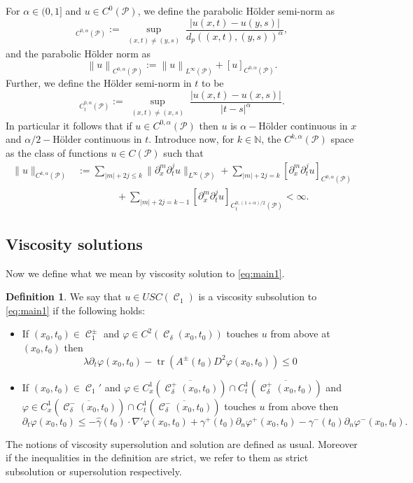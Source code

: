 \documentclass[12pt]{article}
\newcommand{\norm}[1]{\left\lVert#1\right\rVert}
\newcommand{\nor}[1]{\left\lvert#1\right\rvert}
\numberwithin{Theorem}{section}
\theoremstyle{definition}
\newtheorem{Definition}[Theorem]{Definition}
\theoremstyle{remark}
\numberwithin{equation}{section}
\DeclareMathOperator{\C}{\mathcal{C}}
\DeclareMathOperator*{\tr}{tr}
\newcommand{\p}{\partial}
\begin{document}
For ${ \alpha} \in (0,1]$ and $u\in C^{0}(\mathcal{P})$, we define the parabolic H\"older semi-norm as
\begin{equation*}
    [u]_{C^{0,\alpha}(\mathcal{P})} := \sup_{\substack{(x,t)\neq (y,s)}} \frac{\nor{u(x,t)-u(y,s)}}{d_p((x,t),(y,s))^{{ \alpha}}},
\end{equation*}
and the parabolic H\"older norm as
\begin{equation*}
    \norm{u}_{C^{0,{ \alpha}}(\mathcal{P})} := \norm{u}_{L^{\infty}(\mathcal{P})} +[u]_{C^{0,{ \alpha}}({\mathcal{P}})}.
\end{equation*}
Further, we define the H\"older semi-norm in $t$ to be
\begin{equation*}
[u]_{C_t^{0,{ \alpha}}({\mathcal{P}})} := \sup_{ \substack{(x,t)\neq (x,s)}} \frac{|u(x,t)-u(x,s)|}{|t-s|^{ \alpha}}.
\end{equation*}
In particular it follows that if $u \in C^{0,{ \alpha}}(\mathcal{P})$ then $u$ is ${ \alpha}-$H\"older continuous in $x$ and ${ \alpha}/2-$H\"older continuous in $t$.
Introduce now, for $k \in \mathbb{N}$, the $C^{k,{ \alpha}}(\mathcal{P})$ space as the class of functions $u \in C(\mathcal{P})$ such that
\begin{align*}
      \|u\|_{C^{k,{ \alpha}}(\mathcal{P})} &:= \sum_{|m| + 2 j \leq k} \|\p_x^m \p_t^j u\|_{L^\infty(\mathcal{P})} + \sum_{|m| + 2j = k} [\p_x^m \p_t^j u]_{C^{0,{ \alpha}}(\mathcal{P})} \\
      &\qquad\qquad +  \sum_{|m| + 2 j = k-1} [\p_x^m \p_t^j u]_{C_t^{0,(1+{ \alpha})/2}(\mathcal{P})} <\infty. 
 \end{align*}
\subsection{Viscosity solutions}
Now  we define what we mean by viscosity solution to \eqref{eq:main1}.
\begin{Definition}  \label{def:visc}
We say that $u \in USC(\C_1)$ is a viscosity subsolution to \eqref{eq:main1} if the following holds:
\begin{itemize}
    \item[(i)] If $(x_0,t_0) \in \C_1^{\pm}$ and $\varphi \in C^{2}(\C_\delta(x_0,t_0) )$ touches $u$ from above at $(x_0,t_0)$ then 
    \[ 
   \lambda \p_t \varphi(x_0,t_0) - \tr(A^\pm(t_0) D^2 \varphi(x_0,t_0)) \leq 0 
    \]
    \item[(ii)] If $(x_0,t_0) \in \C_1'$ and  $\varphi \in C_x^{1}(\overline{ \C_\delta^+(x_0,t_0)}) \cap  C_t^{1}(\overline{ \C_\delta^+(x_0,t_0)})$ and $\varphi \in C_x^{1}(\overline{ \C_\delta^-(x_0,t_0)}) \cap  C_t^{1}(\overline{ \C_\delta^-(x_0,t_0)})$  touches $u$ from above  then 
    \[
\p_t\varphi(x_0,t_0) \leq  -\hat{\gamma}(t_0) \cdot  \nabla' \varphi(x_0,t_0)  + \gamma^+( t_0) \p_n \varphi^+(x_0,t_0) - \gamma^-(t_0) \p_n \varphi^-(x_0,t_0)  .
    \]
\end{itemize}
The notions of viscosity supersolution and solution are defined as usual. Moreover if the inequalities in the definition are strict, we refer to them as strict subsolution or  supersolution respectively.
\end{Definition} 
\end{document}
